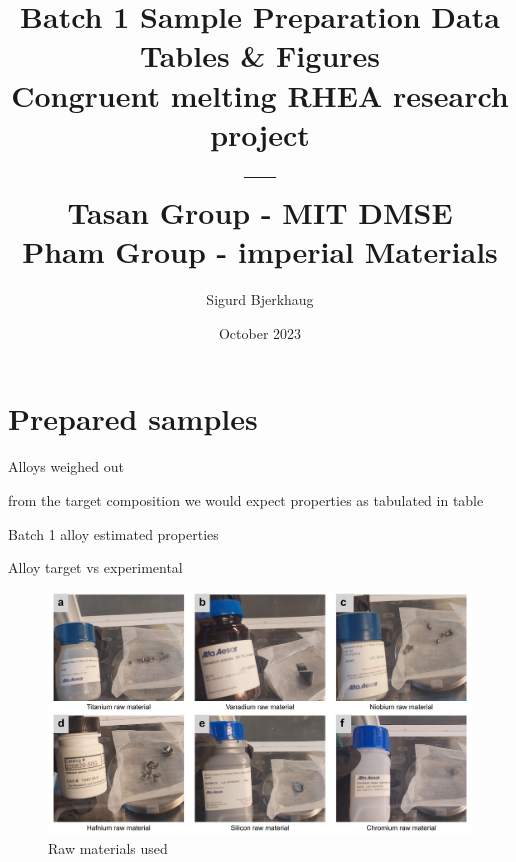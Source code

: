 \documentclass[a4]{article}
\title{Batch 1 Sample Preparation Data Tables \& Figures \\ Congruent melting RHEA research project \\ ---\\Tasan Group - MIT DMSE \\ Pham Group - imperial Materials \\}
\author{Sigurd Bjerkhaug}
\date{October 2023}
\begin{document}
\maketitle

\newpage




\section{Prepared samples}

\begin{table}[h]
    \centering
    \caption{Alloys weighed out}
    
    \label{tab:Batch1 mesured}
\end{table}

from the target composition we would expect properties as tabulated in table
\begin{table}[h]
    \centering
    \caption{Batch 1 alloy estimated properties}
    
    \label{tab:Batch1 mesured}
\end{table}

\begin{table}[h]
    \centering
    \caption{Alloy target vs experimental}
    
    \label{tab:Batch1 mesured}
\end{table}

%    

\begin{figure}
    \centering
    \includegraphics{batch 1 raw materials.jpg}
    \caption{Raw materials used}
    \label{fig:raw-material info}
\end{figure}
\end{document}
